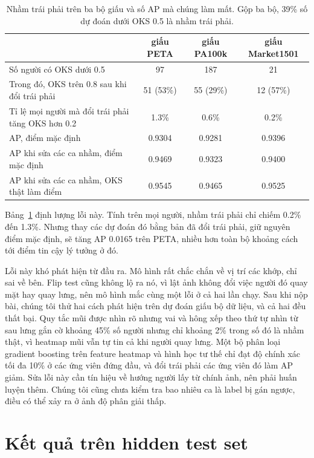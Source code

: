 \documentclass[11pt,a4paper]{article}
\begin{document}
\begin{table}[H]
\centering\small
\begin{tabular}{@{}lccc@{}}
\toprule
& giấu PETA & giấu PA100k & giấu Market1501 \\
\midrule
Số người có OKS dưới 0.5 & 97 & 187 & 21 \\
Trong đó, OKS trên 0.8 sau khi đổi trái phải & 51 (53\%) & 55 (29\%) & 12 (57\%) \\
Tỉ lệ mọi người mà đổi trái phải tăng OKS hơn 0.2 & 1.3\% & 0.6\% & 0.2\% \\
AP, điểm mặc định & 0.9304 & 0.9281 & 0.9396 \\
AP khi sửa các ca nhầm, điểm mặc định & 0.9469 & 0.9323 & 0.9400 \\
AP khi sửa các ca nhầm, OKS thật làm điểm & 0.9545 & 0.9465 & 0.9525 \\
\bottomrule
\end{tabular}
\caption{Nhầm trái phải trên ba bộ giấu và số AP mà chúng làm mất. Gộp ba bộ, 39\% số dự đoán dưới OKS 0.5 là nhầm trái phải.}
\label{tab:swap}
\end{table}

Bảng~\ref{tab:swap} định lượng lỗi này. Tính trên mọi người, nhầm trái phải chỉ chiếm 0.2\% đến 1.3\%. Nhưng thay các dự đoán đó bằng bản đã đổi trái phải, giữ nguyên điểm mặc định, sẽ tăng AP 0.0165 trên PETA, nhiều hơn toàn bộ khoảng cách tới điểm tin cậy lý tưởng ở đó.

Lỗi này khó phát hiện từ đầu ra. Mô hình rất chắc chắn về vị trí các khớp, chỉ sai về bên. Flip test cũng không lộ ra nó, vì lật ảnh không đổi việc người đó quay mặt hay quay lưng, nên mô hình mắc cùng một lỗi ở cả hai lần chạy. Sau khi nộp bài, chúng tôi thử hai cách phát hiện trên dự đoán giấu bộ dữ liệu, và cả hai đều thất bại. Quy tắc mũi được nhìn rõ nhưng vai và hông xếp theo thứ tự nhìn từ sau lưng gắn cờ khoảng 45\% số người nhưng chỉ khoảng 2\% trong số đó là nhầm thật, vì heatmap mũi vẫn tự tin cả khi người quay lưng. Một bộ phân loại gradient boosting trên feature heatmap và hình học tư thế chỉ đạt độ chính xác tối đa 10\% ở các ứng viên đứng đầu, và đổi trái phải các ứng viên đó làm AP giảm. Sửa lỗi này cần tín hiệu về hướng người lấy từ chính ảnh, nên phải huấn luyện thêm. Chúng tôi cũng chưa kiểm tra bao nhiêu ca là label bị gán ngược, điều có thể xảy ra ở ảnh độ phân giải thấp.

\section{Kết quả trên hidden test set}
\label{sec:test}
\end{document}
